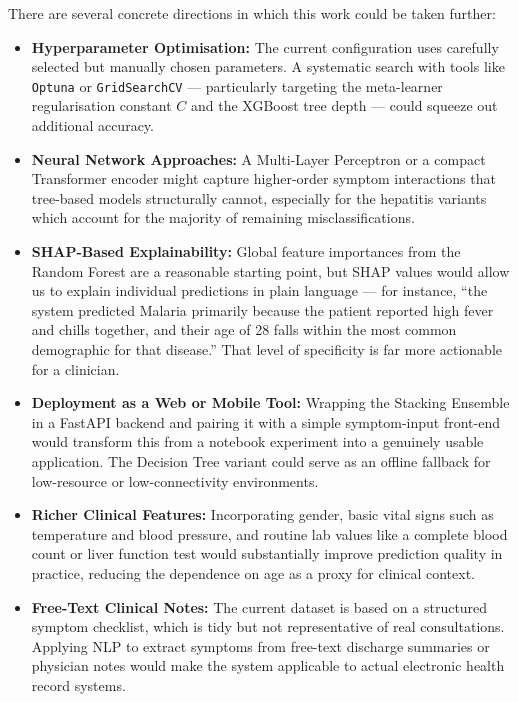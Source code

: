 \documentclass[12pt,a4paper]{article}
\begin{document}
There are several concrete directions in which this work could be taken further:

\begin{itemize}
    \item \textbf{Hyperparameter Optimisation:} The current configuration uses carefully selected but manually chosen parameters. A systematic search with tools like \texttt{Optuna} or \texttt{GridSearchCV} --- particularly targeting the meta-learner regularisation constant $C$ and the XGBoost tree depth --- could squeeze out additional accuracy.
    \item \textbf{Neural Network Approaches:} A Multi-Layer Perceptron or a compact Transformer encoder might capture higher-order symptom interactions that tree-based models structurally cannot, especially for the hepatitis variants which account for the majority of remaining misclassifications.
    \item \textbf{SHAP-Based Explainability:} Global feature importances from the Random Forest are a reasonable starting point, but SHAP values would allow us to explain individual predictions in plain language --- for instance, ``the system predicted Malaria primarily because the patient reported high fever and chills together, and their age of 28 falls within the most common demographic for that disease.'' That level of specificity is far more actionable for a clinician.
    \item \textbf{Deployment as a Web or Mobile Tool:} Wrapping the Stacking Ensemble in a FastAPI backend and pairing it with a simple symptom-input front-end would transform this from a notebook experiment into a genuinely usable application. The Decision Tree variant could serve as an offline fallback for low-resource or low-connectivity environments.
    \item \textbf{Richer Clinical Features:} Incorporating gender, basic vital signs such as temperature and blood pressure, and routine lab values like a complete blood count or liver function test would substantially improve prediction quality in practice, reducing the dependence on age as a proxy for clinical context.
    \item \textbf{Free-Text Clinical Notes:} The current dataset is based on a structured symptom checklist, which is tidy but not representative of real consultations. Applying NLP to extract symptoms from free-text discharge summaries or physician notes would make the system applicable to actual electronic health record systems.
\end{itemize}
\end{document}

